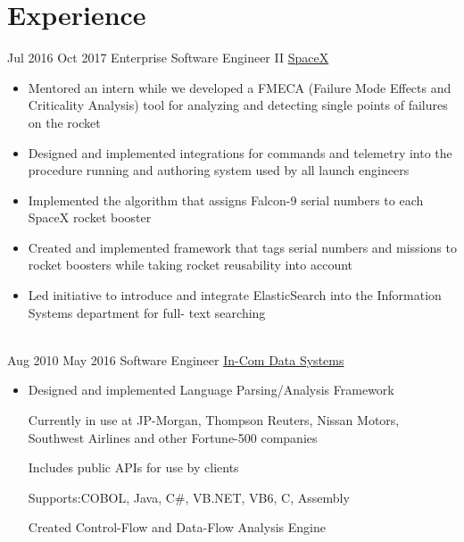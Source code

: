 \documentclass[letterpaper]{resume}
\begin{document}
	
\makeprofile %

\section{Experience}
\begin{twenty} %
	\twentyitem
	{Jul 2016}
	{Oct 2017}
	{Enterprise Software Engineer II}
	{\href{http://www.spacex.com/}{SpaceX}}
	{}
	{\begin{itemize}
		\item Mentored an intern while we developed a FMECA (Failure Mode Effects and Criticality Analysis) tool for
		analyzing and detecting single points of failures on the rocket
		
		\item Designed and implemented integrations for commands and telemetry into the procedure running and
		authoring system used by all launch engineers
		
		\item Implemented the algorithm that assigns Falcon-9 serial numbers to each SpaceX rocket booster
		
		\item Created and implemented framework that tags serial numbers and missions to rocket boosters while
		taking rocket reusability into account
		
		\item Led initiative to introduce and integrate ElasticSearch into the Information Systems department for full-
		text searching
	\end{itemize}}
	
	\\
	
	\twentyitem
	{Aug 2010}
	{May 2016}
	{Software Engineer}
	{\href{http://in-com.com/}{In-Com Data Systems}}
	{}
	{
		{\begin{itemize}
			\item Designed and implemented Language Parsing/Analysis Framework {}
			
			\subitem Currently in use at JP-Morgan, Thompson Reuters, Nissan Motors, Southwest Airlines and other Fortune-500 companies
			
			\subitem Includes public APIs for use by clients
			
			\subitem Supports:COBOL, Java, C\#, VB.NET, VB6, C, Assembly
			
			\subitem Created Control-Flow and Data-Flow Analysis Engine
			
		\end{itemize}}
	}
\end{twenty}
\end{document}
